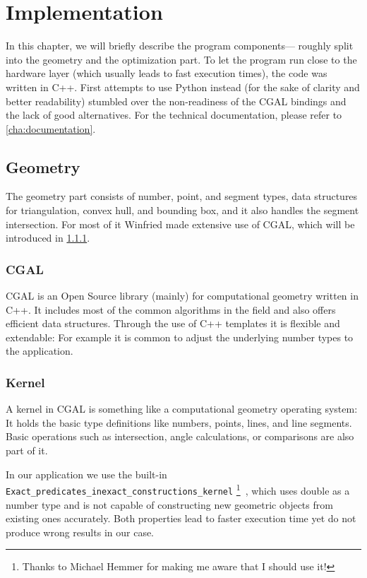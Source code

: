 \chapter{Implementation}
\label{cha:implementation}
In this chapter, we will briefly describe the program components---%
roughly split into the geometry and the optimization part.
To let the program run close to the hardware layer (which usually
leads to fast execution times), the code was written in C++. First
attempts to use Python instead (for the sake of clarity and better
readability) stumbled over the non-readiness of the CGAL bindings and
the lack of good alternatives. For the technical documentation,
please refer to \cref{cha:documentation}.

\section{Geometry}
The geometry part consists of number, point, and segment types, 
data structures for triangulation, convex hull, and bounding box, 
and it also handles the segment intersection. For most of it Winfried 
made extensive use of CGAL, which will be introduced in \cref{sec:CGAL}.

\subsection{CGAL}
\label{sec:CGAL}
CGAL \cite{cgal} is an Open Source library (mainly) for computational
geometry written in C++. It includes most of the common algorithms in
the field and also offers efficient data structures. Through the use
of C++ templates it is flexible and extendable: For example it is
common to adjust the underlying number types to the application.

\subsection{Kernel}
A kernel in CGAL is something like a computational geometry operating
system: It holds the basic type definitions like numbers, points,
lines, and line segments. Basic operations such as intersection,
angle calculations, or comparisons are also part of it.

In our application we use the built-in 
\verb|Exact_predicates_inexact_constructions_kernel|%
\footnote{Thanks to Michael Hemmer for making me aware that I should
use it!}~\cite{cgal_manual_epick}, which uses double as a number type
and is not capable of constructing new geometric objects from existing
ones accurately. Both properties lead to faster execution time yet do 
not produce wrong results in our case.

